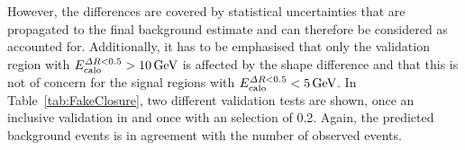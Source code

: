 However, the differences are covered by statistical uncertainties that are propagated to the final background estimate and can therefore be considered as accounted for.
Additionally, it has to be emphasised that only the validation region with $\ecalo>10\gev$ is affected by the \ias shape difference and that this is not of concern for the signal regions with $E^{\Delta R<0.5}_{\text{calo}}<5\,\text{Ge}\kern-0.06667em\text{V}$.
In Table~\ref{tab:FakeClosure}, two different validation tests are shown, once an inclusive validation in \ias and once with an \ias selection of 0.2.
Again, the predicted background events is in agreement with the number of observed events.


\renewcommand{\arraystretch}{1.5}
\begin{table}[!t]
\centering
\caption{Validation test of fake and leptonic background estimation methods. Left: $\ecalo>10\gev$ . Right: $\ecalo>10\gev$ and $\ias>0.2$. Only statistical uncertainties are included.}
\label{tab:FakeClosure}
\end{table}
